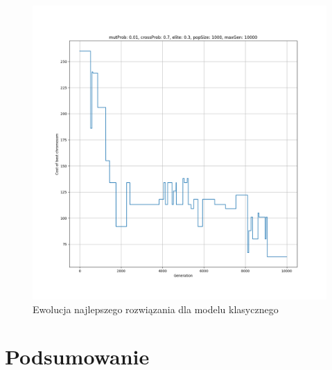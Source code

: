 \documentclass{beamer}
\begin{document}
\begin{frame}
     {
        \begin{figure}[ht]
            \centering
            \includegraphics[scale=0.2]{resultPlot_regular.png}
            \caption{Ewolucja najlepszego rozwiązania dla modelu klasycznego}
        \end{figure}
    }
    

\end{frame}

\section{Podsumowanie}

% 
% 
\end{document}
